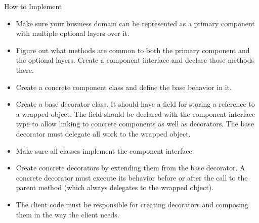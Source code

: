 \documentclass[13pt]{beamer}
\begin{document}
\begin{frame}{How to Implement}
	\begin{itemize}
		\setlength\itemsep{1em}
		\item Make sure your business domain can be represented as a primary component with multiple optional layers over it.
		\item Figure out what methods are common to both the primary component and the optional layers. Create a component interface and declare those methods there.
		\item Create a concrete component class and define the base behavior in it.
		\item Create a base decorator class. It should have a field for storing a reference to a wrapped object. The field should be declared with the component interface type to allow linking to concrete components as well as decorators. The base decorator must delegate all work to the wrapped object.
		\item Make sure all classes implement the component interface.
		\item Create concrete decorators by extending them from the base decorator. A concrete decorator must execute its behavior before or after the call to the parent method (which always delegates to the wrapped object).
		\item The client code must be responsible for creating decorators and composing them in the way the client needs.
	\end{itemize}
\end{frame}
\end{document}

